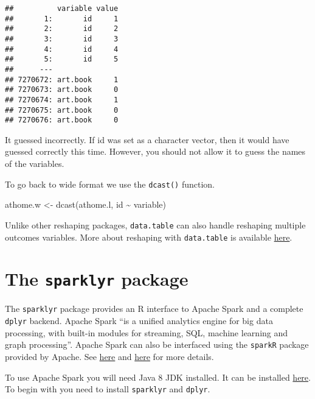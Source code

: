 \documentclass[
]{book}
\newenvironment{Shaded}{\begin{snugshade}}{\end{snugshade}}
\newcommand{\FunctionTok}[1]{\textcolor[rgb]{0.00,0.00,0.00}{#1}}
\newcommand{\NormalTok}[1]{#1}
\newcommand{\OtherTok}[1]{\textcolor[rgb]{0.56,0.35,0.01}{#1}}
\newcommand{\SpecialCharTok}[1]{\textcolor[rgb]{0.00,0.00,0.00}{#1}}
\begin{document}
\begin{verbatim}
##          variable value
##       1:       id     1
##       2:       id     2
##       3:       id     3
##       4:       id     4
##       5:       id     5
##      ---               
## 7270672: art.book     1
## 7270673: art.book     0
## 7270674: art.book     1
## 7270675: art.book     0
## 7270676: art.book     0
\end{verbatim}

It guessed incorrectly. If id was set as a character vector, then it would have guessed correctly this time. However, you should not allow it to guess the names of the variables.

To go back to wide format we use the \texttt{dcast()} function.

\begin{Shaded}
\begin{Highlighting}[]
\NormalTok{athome.w }\OtherTok{\textless{}{-}} \FunctionTok{dcast}\NormalTok{(athome.l,}
\NormalTok{                  id }\SpecialCharTok{\textasciitilde{}}\NormalTok{ variable)}
\end{Highlighting}
\end{Shaded}

Unlike other reshaping packages, \texttt{data.table} can also handle reshaping multiple outcomes variables. More about reshaping with \texttt{data.table} is available \href{https://cran.r-project.org/web/packages/data.table/vignettes/datatable-reshape.html}{here}.

\hypertarget{the-sparklyr-package}{%
\section{\texorpdfstring{The \texttt{sparklyr} package}{The sparklyr package}}\label{the-sparklyr-package}}

The \texttt{sparklyr} package provides an R interface to Apache Spark and a complete \texttt{dplyr} backend. Apache Spark ``is a unified analytics engine for big data processing, with built-in modules for streaming, SQL, machine learning and graph processing''. Apache Spark can also be interfaced using the \texttt{sparkR} package provided by Apache. See \href{https://spark.apache.org/docs/2.4.0/}{here} and \href{https://spark.apache.org/docs/2.4.0/api/R/index.html}{here} for more details.

To use Apache Spark you will need Java 8 JDK installed. It can be installed \href{https://www.oracle.com/technetwork/java/jdk8-downloads-2133151.html}{here}. To begin with you need to install \texttt{sparklyr} and \texttt{dplyr}.
\end{document}
